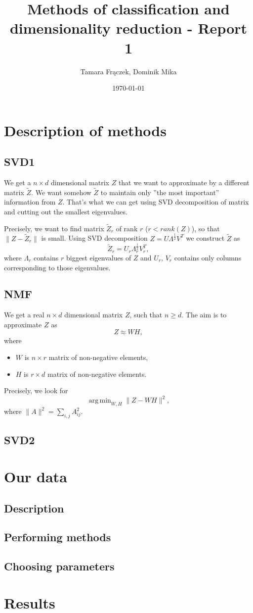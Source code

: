 \documentclass[11pt]{amsart}
\author{Tamara Frączek, Dominik Mika}
\title{Methods of classification and dimensionality reduction - Report 1}
\date{\today}
\DeclareMathOperator*{\argmin}{arg\,min}
\begin{document}
\maketitle


\section{Description of methods}
\subsection*{SVD1}

We get a $n \times d$ dimensional matrix $Z$ that we want to approximate by a different matrix $\tilde{Z}$.
We want somehow $\tilde{Z}$ to maintain only ''the most important'' information from $Z$.
That's what we can get using SVD decomposition of matrix and cutting out the smallest eigenvalues.

Precisely, we want to find matrix $\tilde{Z}_r$ of rank $r$ ($r < rank(Z)$), so that $\|Z - \tilde{Z}_r\|$ is small.
Using SVD decomposition $Z = U \Lambda^{\frac{1}{2}} V^T$ we construct $\tilde{Z}$ as
\[\tilde{Z}_r = U_r \Lambda_r^{\frac{1}{2}}V_r^T,\]
where $\Lambda_r$ contains $r$ biggest eigenvalues of $Z$ and $U_r$, $V_r$ contains only columns corresponding to those eigenvalues.


\subsection*{NMF}
We get a real $n \times d$ dimensional matrix $Z$, such that $n \ge d$.
The aim is to approximate $Z$ as
\[Z \approx WH,\]
where
\begin{itemize}
    \item $W$ is $n \times r$ matrix of non-negative elements,
    \item $H$ is $r \times d$ matrix of non-negative elements.
\end{itemize}
Precisely, we look for
\[\argmin_{W, H} \|Z - WH \|^2,\]
where $\|A\|^2 = \sum_{i, j} A_{ij}^2$.


\subsection*{SVD2}

\section{Our data}
\subsection*{Description}
\subsection*{Performing methods}
\subsection*{Choosing parameters}

\section{Results}
\end{document}
